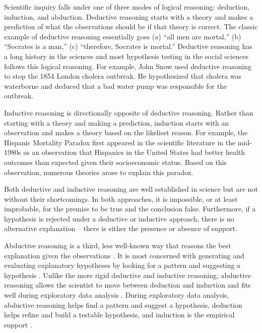 \documentclass[12pt]{article}
\begin{document}
Scientific inquiry falls under one of three modes of logical reasoning:
deduction, induction, and abduction. Deductive reasoning starts with a
theory and makes a prediction of what the observations should be if that
theory is correct. The classic example of deductive reasoning
essentially goes (a) ``all men are mortal,'' (b) ``Socrates is a man,''
(c) ``therefore, Socrates is mortal.'' Deductive reasoning has a long
history in the sciences and most hypothesis testing in the social
sciences follows this logical reasoning. For example, John Snow used
deductive reasoning to stop the 1854 London cholera outbreak. He
hypothesized that cholera was waterborne and deduced that a bad water
pump was responsible for the outbreak.

Inductive reasoning is directionally opposite of deductive reasoning.
Rather than starting with a theory and making a prediction, induction
starts with an observation and makes a theory based on the likeliest
reason. For example, the Hispanic Mortality Paradox first appeared in
the scientific literature in the mid-1980s \citep{markides1986health} as
an observation that Hispanics in the United States had better health
outcomes than expected given their socioeconomic status. Based on this
observation, numerous theories arose to explain this paradox.

Both deductive and inductive reasoning are well established in science
but are not without their shortcomings. In both approaches, it is
impossible, or at least improbable, for the premise to be true and the
conclusion false. Furthermore, if a hypothesis is rejected under a
deductive or inductive approach, there is no alternative explanation --
there is either the presence or absence of support.

Abductive reasoning is a third, less well-known way that reasons the
best explanation given the observations \citep{walton2014abductive}. It
is most concerned with generating and evaluating explanatory hypotheses
\citep{Crowder2017} by looking for a pattern and suggesting a hypothesis
\citep{fann2012peirce, pierce1878deduction}. Unlike the more rigid
deductive and inductive reasoning, abductive reasoning allows the
scientist to move between deduction and induction and fits well during
exploratory data analysis
\citep{yu1994abduction, haig2015commentary, tukey1977exploratory}.
During exploratory data analysis, abductive reasoning helps find a
pattern and suggest a hypothesis, deduction helps refine and build a
testable hypothesis, and induction is the empirical support
\citep{yu1994abduction}.
\end{document}
